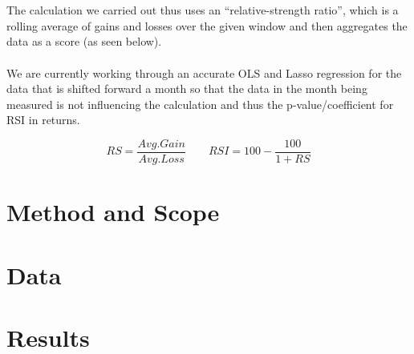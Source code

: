 \documentclass{article}
\begin{document}
\\~\\ The calculation we carried out thus uses an “relative-strength ratio”, which is a rolling average of gains and losses over the given window and then aggregates the data as a score (as seen below). 
\\~\\ We are currently working through an accurate OLS and Lasso regression for the data that is shifted forward a month so that the data in the month being measured is not influencing the calculation and thus the p-value/coefficient for RSI in returns. 

\begin{equation}
    RS = \frac{Avg. Gain}{Avg. Loss}  \qquad
    RSI = 100 - \frac{100}{1+RS}
\end{equation}
\section{Method and Scope}
\section{Data}
\section{Results}
\end{document}
